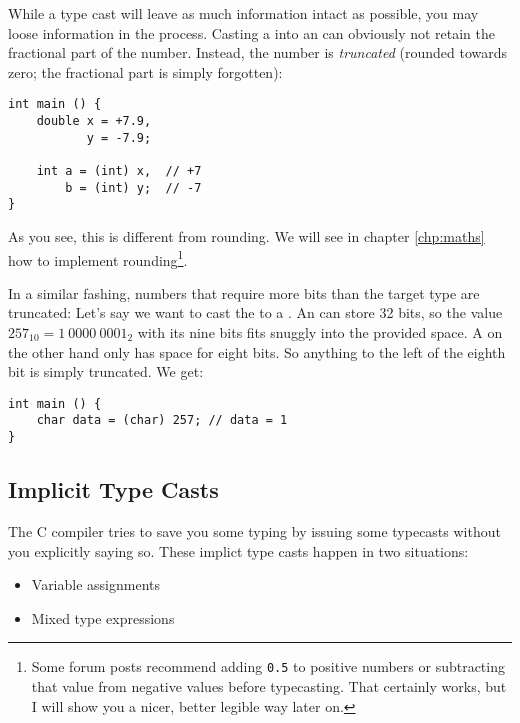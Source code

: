 {While a type cast will leave as much information intact as possible, you may loose information in the process. Casting a  into an  can obviously not retain the fractional part of the number. Instead, the number is \emph{truncated} (rounded towards zero; the fractional part is simply forgotten):

\begin{codebox}[typecastPrecisionLoss.c]
\begin{verbatim}
int main () {
    double x = +7.9,
           y = -7.9;

    int a = (int) x,  // +7
        b = (int) y;  // -7
}
\end{verbatim}
\end{codebox}

As you see, this is different from rounding. We will see in chapter \ref{chp:maths} how to implement rounding\footnote{Some forum posts recommend adding \texttt{0.5} to positive numbers or subtracting that value from negative values before typecasting. That certainly works, but I will show you a nicer, better legible way later on.}.

In a similar fashing, numbers that require more bits than the target type are truncated: Let's say we want to cast the  to a . An  can store 32 bits, so the value $257_{10} = 1~0000~0001_2$ with its nine bits fits snuggly into the provided space. A  on the other hand only has space for eight bits. So anything to the left of the eighth bit is simply truncated. We get:

\begin{codebox}[typecastOverflow.c]
\begin{verbatim}
int main () {
    char data = (char) 257; // data = 1
}
\end{verbatim}
\end{codebox}

\subsection{Implicit Type Casts}
The C compiler tries to save you some typing by issuing some typecasts without you explicitly saying so. These implict type casts happen in two situations:
\begin{itemize}
\item Variable assignments
\item Mixed type expressions
\end{itemize}

}
